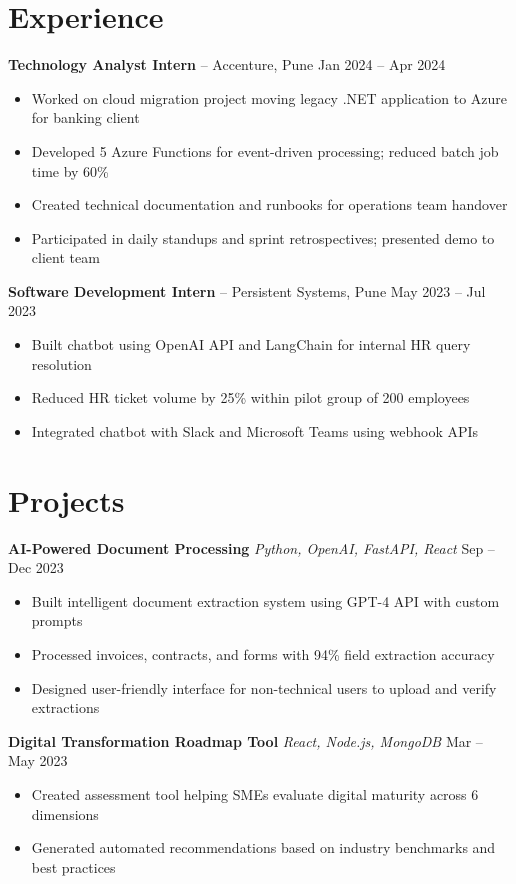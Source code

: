 \documentclass[10pt,a4paper]{article}
\begin{document}
\section{Experience}
\textbf{\color{accent}Technology Analyst Intern} -- Accenture, Pune \hfill Jan 2024 -- Apr 2024
\begin{itemize}
    \item Worked on cloud migration project moving legacy .NET application to Azure for banking client
    \item Developed 5 Azure Functions for event-driven processing; reduced batch job time by 60\%
    \item Created technical documentation and runbooks for operations team handover
    \item Participated in daily standups and sprint retrospectives; presented demo to client team
\end{itemize}

\vspace{3pt}
\textbf{\color{accent}Software Development Intern} -- Persistent Systems, Pune \hfill May 2023 -- Jul 2023
\begin{itemize}
    \item Built chatbot using OpenAI API and LangChain for internal HR query resolution
    \item Reduced HR ticket volume by 25\% within pilot group of 200 employees
    \item Integrated chatbot with Slack and Microsoft Teams using webhook APIs
\end{itemize}

\section{Projects}
\textbf{AI-Powered Document Processing} \quad\textit{\small Python, OpenAI, FastAPI, React} \hfill Sep -- Dec 2023
\begin{itemize}
    \item Built intelligent document extraction system using GPT-4 API with custom prompts
    \item Processed invoices, contracts, and forms with 94\% field extraction accuracy
    \item Designed user-friendly interface for non-technical users to upload and verify extractions
\end{itemize}

\vspace{3pt}
\textbf{Digital Transformation Roadmap Tool} \quad\textit{\small React, Node.js, MongoDB} \hfill Mar -- May 2023
\begin{itemize}
    \item Created assessment tool helping SMEs evaluate digital maturity across 6 dimensions
    \item Generated automated recommendations based on industry benchmarks and best practices
\end{itemize}
\end{document}
